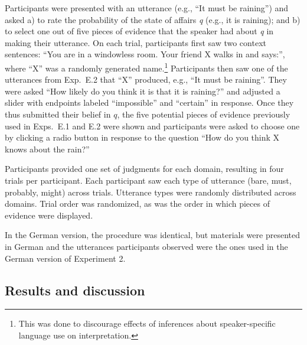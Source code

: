 \documentclass[11pt]{article}
\begin{document}
Participants were presented with an utterance (e.g., ``It must be raining'') and asked a) to rate the probability of the state of affairs \emph{q} (e.g., it is raining); and b) to select one out of five pieces of evidence that the speaker had about \emph{q} in making their utterance. On each trial, participants first saw two context sentences: ``You are in a windowless room. Your friend X walks in and says:'', where ``X'' was a randomly generated name.\footnote{This was done to discourage effects of inferences about speaker-specific language use on interpretation.} Participants then saw one of the utterances from Exp.~E.2 that ``X'' produced, e.g., ``It must be raining''. They were asked ``How likely do you think it is that it is raining?'' and adjusted a slider with endpoints labeled ``impossible'' and ``certain'' in response. Once they thus submitted their belief in $q$, the five potential pieces of evidence previously used in Exps.~E.1 and E.2 were shown and participants were asked to choose one by clicking a radio button in response to the question ``How do you think X knows about the rain?'' 

Participants provided one set of judgments for each domain, resulting in four trials per participant. Each participant saw each type of utterance (bare, must, probably, might)  across trials. Utterance types were randomly distributed across domains. Trial order was randomized, as was the order in which pieces of evidence were displayed.

In the German version, the procedure was identical, but materials were presented in German and the utterances participants observed were the ones used in the German version of Experiment 2.

\subsection{Results and discussion}
\end{document}

